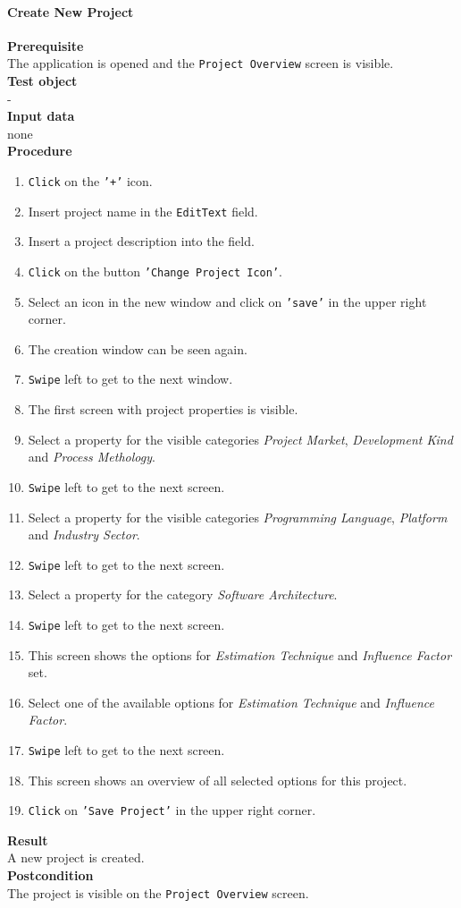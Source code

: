 \paragraph*{\textbf{Create New Project}}
\textbf{Prerequisite}\\
The application is opened and the \texttt{Project Overview} screen is visible.\\
\textbf{Test object}\\
-\\
\textbf{Input data}\\
none\\
\textbf{Procedure}
\begin{enumerate}
	\item \texttt{Click} on the \texttt{'+'} icon.
	\item Insert project name in the \texttt{EditText} field.
	\item Insert a project description into the field.
	\item \texttt{Click} on the button \texttt{'Change Project Icon'}.
	\item Select an icon in the new window and click on \texttt{'save'} in the upper right corner.
	\item The creation window can be seen again.
	\item \texttt{Swipe} left to get to the next window.
	\item The first screen with project properties is visible.
	\item Select a property for the visible categories \textit{Project Market}, \textit{Development Kind} and \textit{Process Methology}.
	\item \texttt{Swipe} left to get to the next screen.
	\item Select a property for the visible categories \textit{Programming Language}, \textit{Platform} and \textit{Industry Sector}.
	\item \texttt{Swipe} left to get to the next screen.
	\item Select a property for the category \textit{Software Architecture}.
	\item \texttt{Swipe} left to get to the next screen.
	\item This screen shows the options for \textit{Estimation Technique} and \textit{Influence Factor} set.
	\item Select one of the available options for \textit{Estimation Technique} and \textit{Influence Factor}.
	\item \texttt{Swipe} left to get to the next screen.
	\item This screen shows an overview of all selected options for this project.
	\item \texttt{Click} on \texttt{'Save Project'} in the upper right corner.
\end{enumerate}
\textbf{Result}\\
A new project is created.\\
\textbf{Postcondition}\\
The project is visible on the \texttt{Project Overview} screen.
